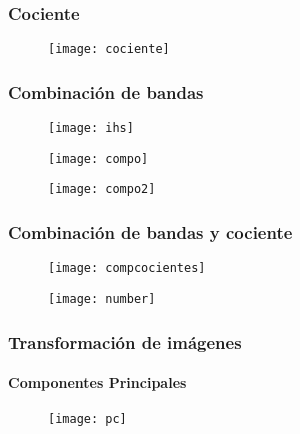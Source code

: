 \documentclass[14pt]{beamer}
\begin{document}
\begin{frame}
\frametitle{Cociente}
  \begin{figure}
    \centering
    \texttt{[image: cociente]}
  \end{figure}
\tiny{}
\end{frame}
\begin{frame}
\frametitle{Combinación de bandas}
  \begin{figure}
    \centering
    \texttt{[image: ihs]}
  \end{figure}
\tiny{}
\end{frame}
\begin{frame}
  \begin{figure}
    \centering
    \texttt{[image: compo]}
  \end{figure}
\tiny{}
\end{frame}
\begin{frame}
  \begin{figure}
    \centering
    \texttt{[image: compo2]}
  \end{figure}
\tiny{}
\end{frame}
\begin{frame}
\frametitle{Combinación de bandas y cociente}
  \begin{figure}
    \centering
    \texttt{[image: compcocientes]}
  \end{figure}
\end{frame}
\begin{frame}
  \begin{figure}
    \centering
    \texttt{[image: number]}
  \end{figure}
\tiny{}
\end{frame}
\begin{frame}
\frametitle{Transformación de imágenes}
\framesubtitle{Componentes Principales}
  \begin{figure}
    \centering
    \texttt{[image: pc]}
  \end{figure}
\tiny{}
\end{frame}
\end{document}
